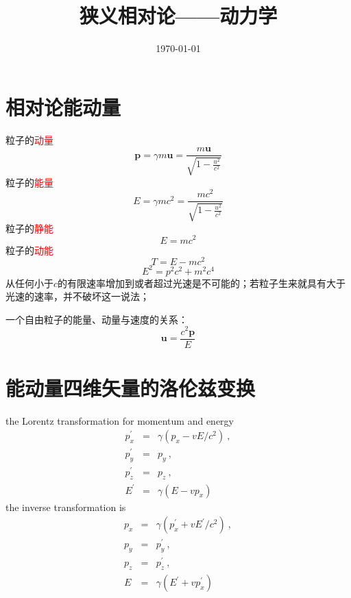 \documentclass[11pt,a4paper]{article}
\title{狭义相对论——动力学}
\author{}
\date{\today}
\renewcommand{\vec}[1]{\boldsymbol{#1}}
\begin{document}
\maketitle

\section{相对论能动量}
粒子的\textcolor{red}{动量}
\begin{equation}
\vec{p} = \gamma m \vec{u} = \frac{m\vec{u}}{\sqrt{1-\frac{u^2}{c^2}}}
\end{equation}
粒子的\textcolor{red}{能量} 
\begin{equation}
E = \gamma m c^2 = \frac{m c^2}{\sqrt{1-\frac{u^2}{c^2}}}
\end{equation}
粒子的\textcolor{red}{静能}
\begin{equation}
E = m c^2
\end{equation}
粒子的\textcolor{red}{动能}
\begin{equation}
T = E - mc^2
\end{equation}
\begin{equation}
E^2 = p^2 c^2 +m^2 c^4
\end{equation}
从任何小于$c$的有限速率增加到或者超过光速是不可能的；若粒子生来就具有大于光速的速率，并不破坏这一说法；

一个自由粒子的能量、动量与速度的关系：
\begin{equation}
\vec{u} = \frac{c^2 \vec{p}}{E}
\end{equation}

\section{能动量四维矢量的洛伦兹变换}
the Lorentz transformation for momentum and energy
\begin{eqnarray}
\nonumber p^{\prime}_x &=& \gamma(p_x -vE/c^2) ~, \\
\nonumber p^{\prime}_y &=& p_y ~, \\
\nonumber p^{\prime}_z &=& p_z ~, \\
E^{\prime} &=& \gamma(E -vp_x)
\end{eqnarray}
the inverse transformation is
\begin{eqnarray}
\nonumber p_x &=& \gamma(p^{\prime}_x +vE^{\prime}/c^2) ~, \\
\nonumber p_y &=& p^{\prime}_y ~, \\
\nonumber p_z &=& p^{\prime}_z ~, \\
E &=& \gamma(E^{\prime} +vp^{\prime}_x) 
\end{eqnarray}
\end{document}
